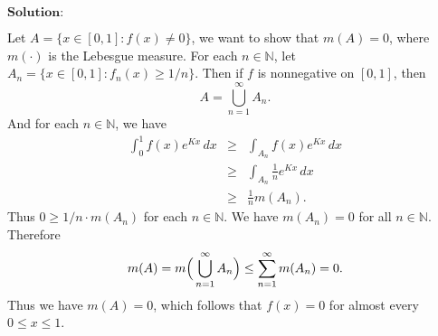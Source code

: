 \documentclass[12pt,a4paper]{ctexart}
\begin{document}
\vspace{8pt}
$\textbf{Solution:}$

Let $A = \{x \in [0,1]: f(x) \neq 0\}$, we want to show that $m(A) = 0$, where $m(\cdot)$ is the Lebesgue measure. For each $n \in \mathbb N$, let $A_n = \{x \in [0,1]: f_n(x) \geq 1/n \}$. Then if $f$ is nonnegative on $[0,1]$, then
$$A = \bigcup_{n=1}^{\infty} A_n.$$
And for each $n \in \mathbb N$, we have
\begin{eqnarray*}
\int_{0}^{1} f(x) e^{K x} \, d x & \geq & \int_{A_n} f(x) e^{K x} \, d x \\
& \geq & \int_{A_n} \frac{1}{n} e^{K x} \, d x \\
& \geq & \frac{1}{n} m(A_n).
\end{eqnarray*}
Thus $0 \geq 1/n \cdot m(A_n)$ for each $n \in \mathbb N$. We have $m(A_n) = 0$ for all $n \in \mathbb N$. Therefore
$$m(A) = m \Big{(} \bigcup_{n=1}^{\infty} A_n \Big{)} \leq \sum_{n=1}^{\infty} m(A_n) = 0.$$
Thus we have $m(A) = 0$, which follows that $f(x) = 0$ for almost every $0 \leq x \leq 1$. 
\end{document}
